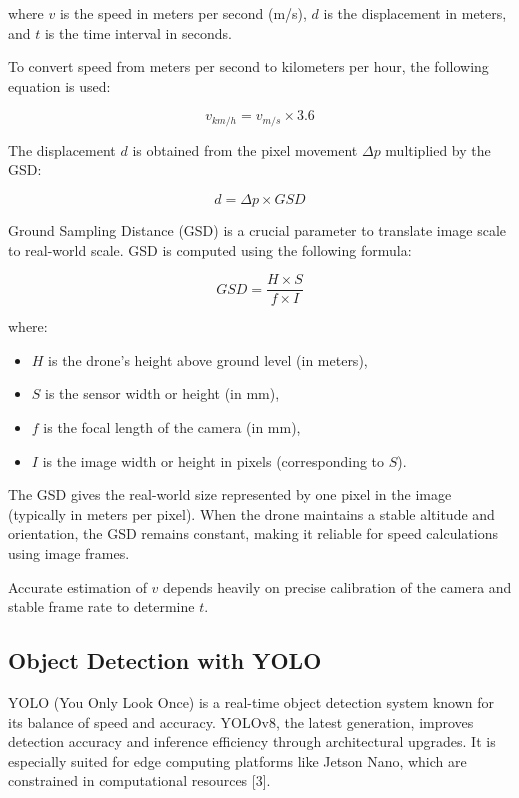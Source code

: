 where $v$ is the speed in meters per second (m/s), $d$ is the displacement in meters, and $t$ is the time interval in seconds.

To convert speed from meters per second to kilometers per hour, the following equation is used:

\begin{equation}
    v_{km/h} = v_{m/s} \times 3.6
    \label{eq:speed_conversion}
\end{equation}

The displacement $d$ is obtained from the pixel movement $\Delta p$ multiplied by the GSD:

\begin{equation}
    d = \Delta p \times GSD
    \label{eq:displacement}
\end{equation}

Ground Sampling Distance (GSD) is a crucial parameter to translate image scale to real-world scale. GSD is computed using the following formula:

\begin{equation}
    GSD = \frac{H \times S}{f \times I}
    \label{eq:gsd}
\end{equation}

where:
\begin{itemize}
    \item $H$ is the drone's height above ground level (in meters),
    \item $S$ is the sensor width or height (in mm),
    \item $f$ is the focal length of the camera (in mm),
    \item $I$ is the image width or height in pixels (corresponding to $S$).
\end{itemize}

The GSD gives the real-world size represented by one pixel in the image (typically in meters per pixel). When the drone maintains a stable altitude and orientation, the GSD remains constant, making it reliable for speed calculations using image frames.

Accurate estimation of $v$ depends heavily on precise calibration of the camera and stable frame rate to determine $t$.

\subsection{Object Detection with YOLO}
YOLO (You Only Look Once) is a real-time object detection system known for its balance of speed and accuracy. YOLOv8, the latest generation, improves detection accuracy and inference efficiency through architectural upgrades. It is especially suited for edge computing platforms like Jetson Nano, which are constrained in computational resources [3].

